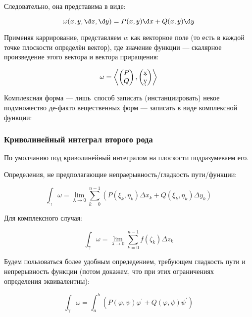 \documentclass[12pt, a4paper]{book}
\begin{document}
Следовательно, она представима в виде:

\begin{equation}
    \omega(x, y, \d x, \d y) = P(x, y) \d x + Q(x, y) \d y
\end{equation}

Применяя каррирование, представляем $w$ как векторное поле (то есть в каждой точке плоскости определён вектор),
где значение функции — скалярное произведение этого вектора и вектора приращения:

\begin{equation}
    \omega = \left\langle \begin{pmatrix}
        P \\ Q
    \end{pmatrix}, \begin{pmatrix}
        \d x \\ 
        \d y
    \end{pmatrix} \right\rangle
\end{equation}


Комплексная форма — лишь способ записать (инстанциировать) некое подмножество де-факто вещественных форм —
записать в виде комплексной функции:

\subsubsection{Криволинейный интеграл \textbf{второго} рода}

По умолчанию под криволинейный интегралом на плоскости подразумеваем его.

Определения, не предполагающие непраерывность/гладкость пути/функции:

\begin{equation}
    \int_\gamma \omega=\lim _{\lambda \rightarrow 0} \sum_{k=0}^{n-1}\left(P\left(\xi_k, \eta_k\right) \Delta x_k+Q\left(\xi_k, \eta_k\right) \Delta y_k\right)
\end{equation}

Для комплексного случая: 

\begin{equation}
    \int_\gamma \omega=\lim _{\lambda \rightarrow 0} \sum_{k=0}^{n-1} f\left(\zeta_k\right) \Delta z_k
\end{equation}


Будем пользоваться более удобным опредедением, требующем гладкость пути и непрерывность функции 
(потом докажем, что при этих ограничениях определения эквивалентны):

\begin{equation}
    \int_\gamma \omega=\int_a^b\left(P(\varphi, \psi) \varphi^{\prime}+Q(\varphi, \psi) \psi^{\prime}\right)
\end{equation}
\end{document}
